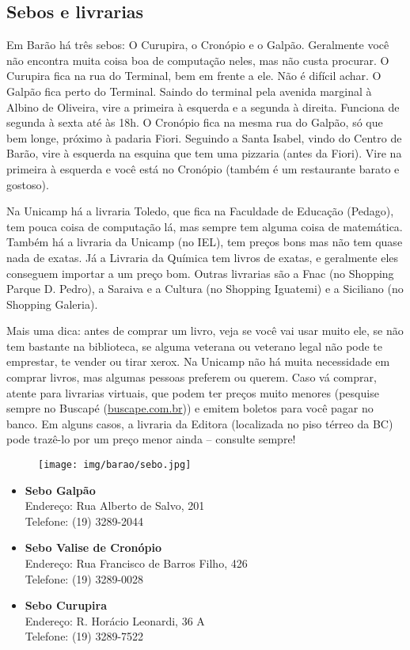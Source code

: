 \subsection{Sebos e livrarias}

Em Barão há três sebos: O Curupira, o Cronópio e o Galpão. Geralmente você não
encontra muita coisa boa de computação neles, mas não custa procurar. O
Curupira fica na rua do Terminal, bem em frente a ele. Não é difícil achar. O
Galpão fica perto do Terminal. Saindo do terminal pela avenida marginal à
Albino de Oliveira, vire a primeira à esquerda e a segunda à direita. Funciona
de segunda à sexta até às 18h. O Cronópio fica na mesma rua do Galpão, só que
bem longe, próximo à padaria Fiori. Seguindo a Santa Isabel, vindo do Centro de
Barão, vire à esquerda na esquina que tem uma pizzaria (antes da Fiori). Vire
na primeira à esquerda e você está no Cronópio (também é um restaurante barato
e gostoso).

Na Unicamp há a livraria Toledo, que fica na Faculdade de Educação (Pedago),
tem pouca coisa de computação lá, mas sempre tem alguma coisa de matemática.
Também há a livraria da Unicamp (no IEL), tem preços bons mas não tem quase
nada de exatas. Já a Livraria da Química tem livros de exatas, e geralmente
eles conseguem importar a um preço bom. Outras livrarias são a Fnac (no
Shopping Parque D. Pedro), a Saraiva e a Cultura (no Shopping Iguatemi) e a
Siciliano (no Shopping Galeria).

Mais uma dica: antes de comprar um livro, veja se você vai usar muito ele, se
não tem bastante na biblioteca, se alguma veterana ou veterano legal não pode
te emprestar, te vender ou tirar xerox. Na Unicamp não há muita necessidade em
comprar livros, mas algumas pessoas preferem ou querem. Caso vá comprar, atente
para livrarias virtuais, que podem ter preços muito menores (pesquise sempre no
Buscapé (\url{buscape.com.br})) e emitem boletos para você pagar no banco. Em
alguns casos, a livraria da Editora (localizada no piso térreo da BC) pode
trazê-lo por um preço menor ainda -- consulte sempre!

\begin{figure}[h!]
    \centering
    \texttt{[image: img/barao/sebo.jpg]}
\end{figure}

\begin{itemize}
    \item   \textbf{Sebo Galpão}
        \\Endereço: Rua Alberto de Salvo, 201
        \\Telefone: (19) 3289-2044

    \item   \textbf{Sebo Valise de Cronópio}
        \\Endereço: Rua Francisco de Barros Filho, 426
        \\Telefone: (19) 3289-0028

    \item   \textbf{Sebo Curupira}
        \\Endereço: R. Horácio Leonardi, 36 A
        \\Telefone: (19) 3289-7522
\end{itemize}

